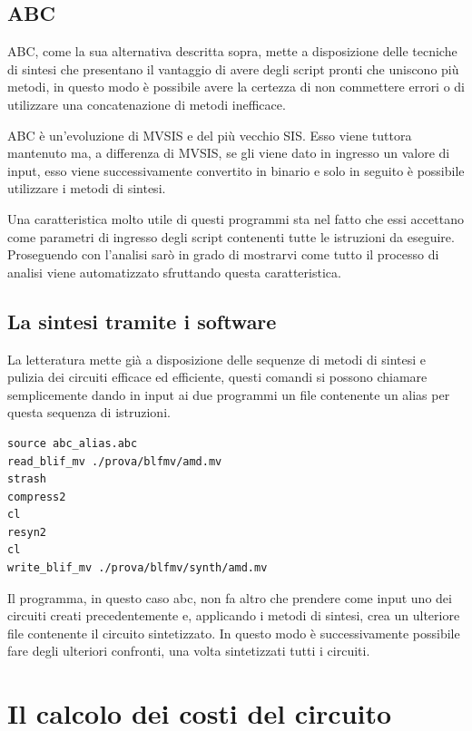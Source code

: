 \documentclass[italian,]{book}
\begin{document}
\hypertarget{abc-1}{%
\subsection{ABC}\label{abc-1}}

ABC, come la sua alternativa descritta sopra, mette a disposizione delle tecniche di sintesi che presentano il vantaggio di avere degli script pronti che uniscono più metodi, in questo modo è possibile avere la certezza di non commettere errori o di utilizzare una concatenazione di metodi inefficace.

ABC è un'evoluzione di MVSIS e del più vecchio SIS. Esso viene tuttora mantenuto ma, a differenza di MVSIS, se gli viene dato in ingresso un valore di input, esso viene successivamente convertito in binario e solo in seguito è possibile utilizzare i metodi di sintesi.

Una caratteristica molto utile di questi programmi sta nel fatto che essi accettano come parametri di ingresso degli script contenenti tutte le istruzioni da eseguire. Proseguendo con l'analisi sarò in grado di mostrarvi come tutto il processo di analisi viene automatizzato sfruttando questa caratteristica.

\newpage

\hypertarget{la-sintesi-tramite-i-software}{%
\subsection{La sintesi tramite i software}\label{la-sintesi-tramite-i-software}}

La letteratura mette già a disposizione delle sequenze di metodi di sintesi e pulizia dei circuiti efficace ed efficiente, questi comandi si possono chiamare semplicemente dando in input ai due programmi un file contenente un alias per questa sequenza di istruzioni.

\begin{verbatim}
source abc_alias.abc
read_blif_mv ./prova/blfmv/amd.mv
strash
compress2
cl
resyn2
cl
write_blif_mv ./prova/blfmv/synth/amd.mv
\end{verbatim}

Il programma, in questo caso abc, non fa altro che prendere come input uno dei circuiti creati precedentemente e, applicando i metodi di sintesi, crea un ulteriore file contenente il circuito sintetizzato. In questo modo è successivamente possibile fare degli ulteriori confronti, una volta sintetizzati tutti i circuiti.

\hypertarget{il-calcolo-dei-costi-del-circuito}{%
\section{Il calcolo dei costi del circuito}\label{il-calcolo-dei-costi-del-circuito}}
\end{document}
